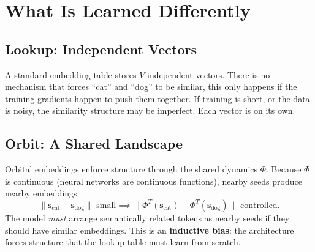 \documentclass[11pt, a4paper]{article}
\newcommand{\s}{\mathbf{s}}
\theoremstyle{remark}
\begin{document}
\section{What Is Learned Differently}
\label{sec:learned-differently}

\subsection{Lookup: Independent Vectors}

A standard embedding table stores $V$ independent vectors.
There is no mechanism that forces ``cat'' and ``dog'' to be similar, this only happens if the training gradients happen to push them together.
If training is short, or the data is noisy, the similarity structure may be imperfect.
Each vector is on its own.

\subsection{Orbit: A Shared Landscape}

Orbital embeddings enforce structure through the shared dynamics $\Phi$.
Because $\Phi$ is continuous (neural networks are continuous functions), nearby seeds produce nearby embeddings:
\[
    \|\s_{\text{cat}} - \s_{\text{dog}}\| \text{ small} \implies \|\Phi^T(\s_{\text{cat}}) - \Phi^T(\s_{\text{dog}})\| \text{ controlled.}
\]
The model \emph{must} arrange semantically related tokens as nearby seeds if they should have similar embeddings.
This is an \textbf{inductive bias}: the architecture forces structure that the lookup table must learn from scratch.
\end{document}
